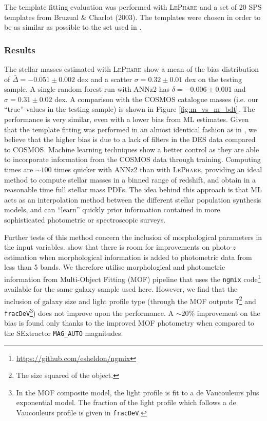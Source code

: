 The template fitting evaluation was performed with \textsc{LePhare} and a set of 20 SPS templates from Bruzual \& Charlot (2003). The templates were chosen in order to be as similar as possible to the set used in \citet{laigle}. 

\subsubsection{Results}
The stellar masses estimated with \textsc{LePhare} show a mean of the bias distribution of $\bar{\Delta}=-0.051\pm 0.002$ dex and a scatter $\sigma = 0.32\pm 0.01$ dex on the testing sample. A single random forest run with ANNz2 has $\delta=-0.006\pm 0.001$ and $\sigma=0.31\pm 0.02$ dex. A comparison with the COSMOS catalogue masses (i.e. our ``true'' values in the testing sample) is shown in Figure \ref{fig:m_vs_m_bdt}. The performance is very similar, even with a lower bias from ML estimates. Given that the template fitting was performed in an almost identical fashion as in \citet{laigle}, we believe that the higher bias is due to a lack of filters in the DES data compared to COSMOS. Machine learning techniques show a better control as they are able to incorporate information from the COSMOS data through training. Computing times are $\sim 100$ times quicker with ANNz2 than with \textsc{LePhare}, providing an ideal method to compute stellar masses in a binned range of redshift, and obtain in a reasonable time full stellar mass PDFs.
The idea behind this approach is that ML acts as an interpolation method between the different stellar population synthesis models, and can ``learn'' quickly prior information contained in more sophisticated photometric or spectroscopic surveys.

Further tests of this method concern the inclusion of morphological parameters in the input variables. \citet{soo} show that there is room for improvements on photo-$z$ estimation when morphological information is added to photometric data from less than 5 bands. We therefore utilise morphological and photometric information from Multi-Object Fitting (MOF) pipeline that uses the \texttt{ngmix} code\footnote{\url{https://github.com/esheldon/ngmix}} available for the same galaxy sample used here. However, we find that the inclusion of galaxy size and light profile type (through the MOF outputs \texttt{T}\footnote{The size squared of the object.} and \texttt{fracDeV}\footnote{In the MOF composite model, the light profile is fit to a de Vaucouleurs plus exponential model. The fraction of the light profile which follows a de Vaucouleurs profile is given in \texttt{fracDeV}.}) does not improve upon the performance. A $\sim 20\%$ improvement on the bias is found only thanks to the improved MOF photometry when compared to the SExtractor \texttt{MAG\_AUTO} magnitudes. %

